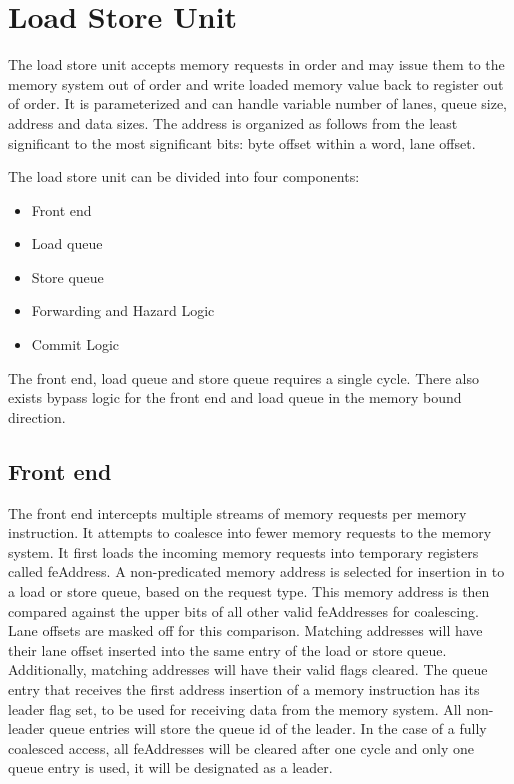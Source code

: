 
\section{Load Store Unit}
The load store unit accepts memory requests in order and may issue them to the memory system out of order and write loaded memory value back to register out of order. It is parameterized and can handle variable number of lanes, queue size, address and data sizes. The address is organized as follows from the least significant to the most significant bits: byte offset within a word, lane offset. 

The load store unit can be divided into four components:
\begin{itemize}
  \item Front end
  \item Load queue
  \item Store queue
  \item Forwarding and Hazard Logic
  \item Commit Logic
\end{itemize}

The front end, load queue and store queue requires a single cycle. There also exists bypass logic for the front end and load queue in the memory bound direction.

\subsection{Front end}
The front end intercepts multiple streams of memory requests per memory instruction. It attempts to coalesce into fewer memory requests to the memory system. It first loads the incoming memory requests into temporary registers called feAddress. A non-predicated memory address is selected for insertion in to a load or store queue, based on the request type. This memory address is then compared against the upper bits of all other valid feAddresses for coalescing. Lane offsets are masked off for this comparison. Matching addresses will have their lane offset inserted into the same entry of the load or store queue. Additionally, matching addresses will have their valid flags cleared. The queue entry that receives the first address insertion of a memory instruction has its leader flag set, to be used for receiving data from the memory system. All non-leader queue entries will store the queue id of the leader. In the case of a fully coalesced access, all feAddresses will be cleared after one cycle and only one queue entry is used, it will be designated as a leader.

